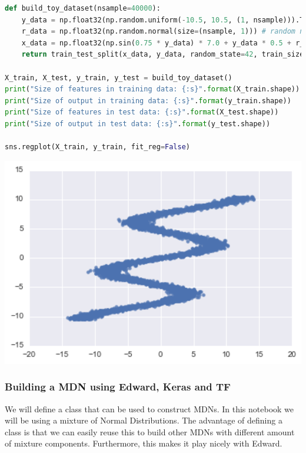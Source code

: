 \begin{lstlisting}[language=Python]
def build_toy_dataset(nsample=40000):
    y_data = np.float32(np.random.uniform(-10.5, 10.5, (1, nsample))).T
    r_data = np.float32(np.random.normal(size=(nsample, 1))) # random noise
    x_data = np.float32(np.sin(0.75 * y_data) * 7.0 + y_data * 0.5 + r_data * 1.0)
    return train_test_split(x_data, y_data, random_state=42, train_size=0.1)

X_train, X_test, y_train, y_test = build_toy_dataset()
print("Size of features in training data: {:s}".format(X_train.shape))
print("Size of output in training data: {:s}".format(y_train.shape))
print("Size of features in test data: {:s}".format(X_test.shape))
print("Size of output in test data: {:s}".format(y_test.shape))

sns.regplot(X_train, y_train, fit_reg=False)
\end{lstlisting}

\includegraphics[width=700px]{images/mdn-fig0.png}

\subsubsection{Building a MDN using Edward, Keras and TF}

We will define a class that can be used to construct MDNs. In this notebook we will be using a mixture of Normal Distributions. The advantage of defining a class is that we can easily reuse this to build other MDNs with different amount of mixture components. Furthermore, this makes it play nicely with Edward.

